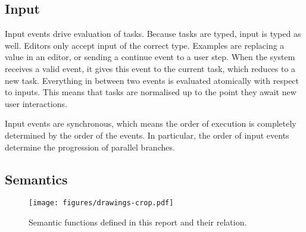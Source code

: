 \subsection{Input}

Input events drive evaluation of tasks.
Because tasks are typed, input is typed as well.
Editors only accept input of the correct type.
Examples are replacing a value in an editor,
or sending a continue event to a user step.
When the system receives a valid event, it gives this event to the current task, which reduces to a new task.
Everything in between two events is evaluated atomically with respect to inputs.
This means that tasks are normalised up to the point they await new user interactions.

Input events are synchronous, which means the order of execution is completely determined by the order of the events.
In particular, the order of input events determine the progression of parallel branches.


\subsection{Semantics}
\begin{figure}[h]
  \centering
  \texttt{[image: figures/drawings-crop.pdf]}
  \caption{
    Semantic functions defined in this report and their relation.
  }
  \label{fig:semantic-functions}
\end{figure}
